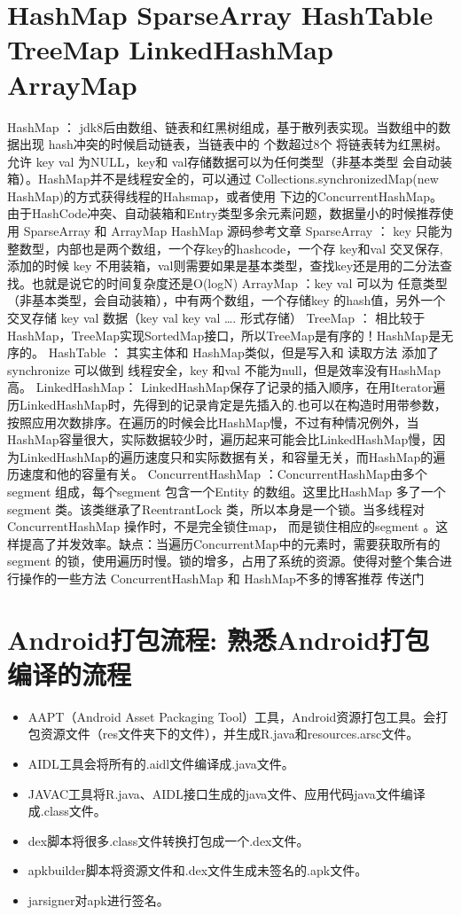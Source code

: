 \documentclass[9pt, b5paper]{article}
\begin{document}
\section{HashMap SparseArray HashTable TreeMap LinkedHashMap ArrayMap}
\label{sec-11}
HashMap ： jdk8后由数组、链表和红黑树组成，基于散列表实现。当数组中的数据出现 hash冲突的时候启动链表，当链表中的 个数超过8个 将链表转为红黑树。允许 key val 为NULL，key和 val存储数据可以为任何类型（非基本类型 会自动装箱）。HashMap并不是线程安全的，可以通过 Collections.synchronizedMap(new HashMap)的方式获得线程的Hahsmap，或者使用 下边的ConcurrentHashMap。
由于HashCode冲突、自动装箱和Entry类型多余元素问题，数据量小的时候推荐使用 SparseArray 和 ArrayMap
HashMap 源码参考文章
SparseArray ： key 只能为整数型，内部也是两个数组，一个存key的hashcode，一个存 key和val 交叉保存, 添加的时候 key 不用装箱，val则需要如果是基本类型，查找key还是用的二分法查找。也就是说它的时间复杂度还是O(logN)
ArrayMap ：key val 可以为 任意类型（非基本类型，会自动装箱），中有两个数组，一个存储key 的hash值，另外一个交叉存储 key val 数据（key val key val \ldots{}. 形式存储）
TreeMap ： 相比较于HashMap，TreeMap实现SortedMap接口，所以TreeMap是有序的！HashMap是无序的。
HashTable ： 其实主体和 HashMap类似，但是写入和 读取方法 添加了 synchronize 可以做到 线程安全，key 和val 不能为null，但是效率没有HashMap高。
LinkedHashMap： LinkedHashMap保存了记录的插入顺序，在用Iterator遍历LinkedHashMap时，先得到的记录肯定是先插入的.也可以在构造时用带参数，按照应用次数排序。在遍历的时候会比HashMap慢，不过有种情况例外，当HashMap容量很大，实际数据较少时，遍历起来可能会比LinkedHashMap慢，因为LinkedHashMap的遍历速度只和实际数据有关，和容量无关，而HashMap的遍历速度和他的容量有关。
ConcurrentHashMap ：ConcurrentHashMap由多个segment 组成，每个segment 包含一个Entity 的数组。这里比HashMap 多了一个segment 类。该类继承了ReentrantLock 类，所以本身是一个锁。当多线程对ConcurrentHashMap 操作时，不是完全锁住map， 而是锁住相应的segment 。这样提高了并发效率。缺点：当遍历ConcurrentMap中的元素时，需要获取所有的segment 的锁，使用遍历时慢。锁的增多，占用了系统的资源。使得对整个集合进行操作的一些方法
ConcurrentHashMap 和 HashMap不多的博客推荐 传送门

\section{Android打包流程: 熟悉Android打包编译的流程}
\label{sec-12}
\begin{itemize}
\item AAPT（Android Asset Packaging Tool）工具，Android资源打包工具。会打包资源文件（res文件夹下的文件），并生成R.java和resources.arsc文件。
\item AIDL工具会将所有的.aidl文件编译成.java文件。
\item JAVAC工具将R.java、AIDL接口生成的java文件、应用代码java文件编译成.class文件。
\item dex脚本将很多.class文件转换打包成一个.dex文件。
\item apkbuilder脚本将资源文件和.dex文件生成未签名的.apk文件。
\item jarsigner对apk进行签名。
\end{itemize}
\end{document}

